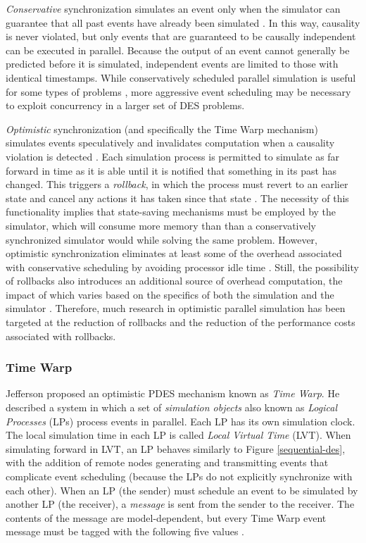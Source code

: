 \documentclass[11pt]{book}
\begin{document}
\emph{Conservative} synchronization simulates an event only when the simulator can
guarantee that all past events have already been simulated \cite{chandy-79,fujimoto-90}.
In this way, causality is never violated, but only events that are guaranteed to be
causally independent can be executed in parallel.  Because the output of an event cannot
generally be predicted before it is simulated, independent events are limited to those
with identical timestamps.  While conservatively scheduled parallel simulation is useful
for some types of problems \cite{nicol-93b}, more aggressive event scheduling may be
necessary to exploit concurrency in a larger set of DES problems.

\emph{Optimistic} synchronization (and specifically the Time Warp mechanism) simulates
events speculatively and invalidates computation when a causality violation is detected
\cite{fujimoto-90,jefferson-85}.  Each simulation process is permitted to simulate as far
forward in time as it is able until it is notified that something in its past has changed.
This triggers a \emph{rollback}, in which the process must revert to an earlier state and
cancel any actions it has taken since that state \cite{nicol-93b}.  The necessity of this
functionality implies that state-saving mechanisms must be employed by the simulator,
which will consume more memory than than a conservatively synchronized simulator would
while solving the same problem.  However, optimistic synchronization eliminates at least
some of the overhead associated with conservative scheduling by avoiding processor idle
time \cite{nicol-93b}.  Still, the possibility of rollbacks also introduces an additional
source of overhead computation, the impact of which varies based on the specifics of both
the simulation and the simulator \cite{fujimoto-pdes}.  Therefore, much research in
optimistic parallel simulation has been targeted at the reduction of rollbacks and the
reduction of the performance costs associated with rollbacks.

\subsubsection{Time Warp}\label{time-warp}

Jefferson \cite{jefferson-85} proposed an optimistic PDES mechanism known as \emph{Time
  Warp}.  He described a system in which a set of \textit{simulation objects} also known
as \emph{Logical Processes} (LPs) process events in parallel.  Each LP has its own
simulation clock.  The local simulation time in each LP is called \emph{Local Virtual
  Time} (LVT).  When simulating forward in LVT, an LP behaves similarly to Figure
\ref{sequential-des}, with the addition of remote nodes generating and transmitting events
that complicate event scheduling (because the LPs do not explicitly synchronize with each
other).  When an LP (the sender) must schedule an event to be simulated by another LP (the
receiver), a \emph{message} is sent from the sender to the receiver.  The contents of the
message are model-dependent, but every Time Warp event message must be tagged with the
following five values \cite{jefferson-85}.
\end{document}
